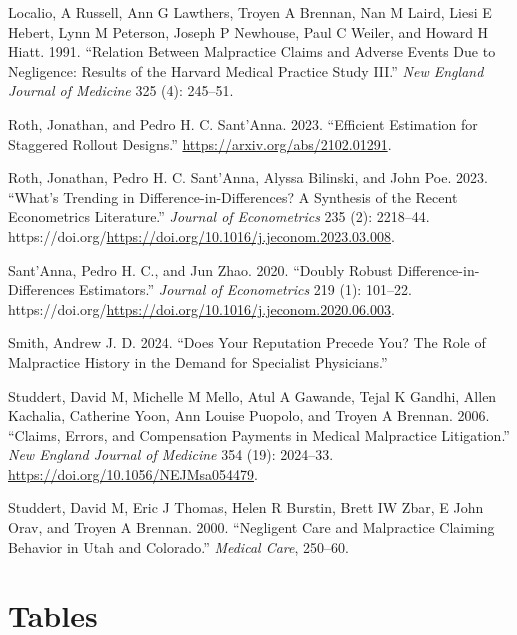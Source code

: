 \documentclass[
  12pt,
]{article}
\newlength{\cslhangindent}
\newlength{\cslentryspacingunit} %
\newenvironment{CSLReferences}[2] %
 {%
  \setlength{\parindent}{0pt}
  \ifodd #1
  \let\oldpar\par
  \def\par{\hangindent=\cslhangindent\oldpar}
  \fi
  \setlength{\parskip}{#2\cslentryspacingunit}
 }%
 {}
\begin{document}
\begin{CSLReferences}{1}{0}
\leavevmode{}%
Localio, A Russell, Ann G Lawthers, Troyen A Brennan, Nan M Laird, Liesi E Hebert, Lynn M Peterson, Joseph P Newhouse, Paul C Weiler, and Howard H Hiatt. 1991. {``Relation Between Malpractice Claims and Adverse Events Due to Negligence: Results of the Harvard Medical Practice Study III.''} \emph{New England Journal of Medicine} 325 (4): 245--51.

\leavevmode{}%
Roth, Jonathan, and Pedro H. C. Sant'Anna. 2023. {``Efficient Estimation for Staggered Rollout Designs.''} \url{https://arxiv.org/abs/2102.01291}.

\leavevmode{}%
Roth, Jonathan, Pedro H. C. Sant'Anna, Alyssa Bilinski, and John Poe. 2023. {``What's Trending in Difference-in-Differences? A Synthesis of the Recent Econometrics Literature.''} \emph{Journal of Econometrics} 235 (2): 2218--44. https://doi.org/\url{https://doi.org/10.1016/j.jeconom.2023.03.008}.

\leavevmode{}%
Sant'Anna, Pedro H. C., and Jun Zhao. 2020. {``Doubly Robust Difference-in-Differences Estimators.''} \emph{Journal of Econometrics} 219 (1): 101--22. https://doi.org/\url{https://doi.org/10.1016/j.jeconom.2020.06.003}.

\leavevmode{}%
Smith, Andrew J. D. 2024. {``Does Your Reputation Precede You? The Role of Malpractice History in the Demand for Specialist Physicians.''}

\leavevmode{}%
Studdert, David M, Michelle M Mello, Atul A Gawande, Tejal K Gandhi, Allen Kachalia, Catherine Yoon, Ann Louise Puopolo, and Troyen A Brennan. 2006. {``Claims, Errors, and Compensation Payments in Medical Malpractice Litigation.''} \emph{New England Journal of Medicine} 354 (19): 2024--33. \url{https://doi.org/10.1056/NEJMsa054479}.

\leavevmode{}%
Studdert, David M, Eric J Thomas, Helen R Burstin, Brett IW Zbar, E John Orav, and Troyen A Brennan. 2000. {``Negligent Care and Malpractice Claiming Behavior in Utah and Colorado.''} \emph{Medical Care}, 250--60.

\end{CSLReferences}

\newpage

\hypertarget{tables}{%
\section{Tables}\label{tables}}
\end{document}
